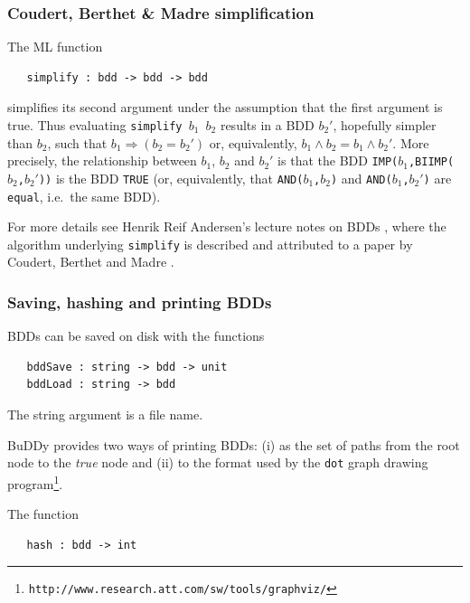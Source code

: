 \documentclass[12pt,fleqn]{book}
\renewcommand{\t}[1]{\mbox{\tt #1}}
\newcommand{\Buddy}{BuDDy{}}
\begin{document}
\subsubsection{Coudert, Berthet \& Madre simplification}

The ML function

\begin{verbatim}
   simplify : bdd -> bdd -> bdd
\end{verbatim}

simplifies its second argument under the assumption that the first
argument is true. Thus evaluating
\t{simplify~$b_1$~$b_2$} results in a BDD $b_2'$, hopefully simpler than $b_2$, such that
$b_1 \Rightarrow (b_2 = b_2')$ or, equivalently, \mbox{$b_1 \wedge b_2 = b_1 \wedge b_2'$}.
More precisely,
the relationship between $b_1$, $b_2$ and $b_2'$ is that
the BDD \t{IMP($b_1$,BIIMP($b_2$,$b_2'$))} is the BDD \t{TRUE}
(or, equivalently, that \t{AND($b_1$,$b_2$)} and \t{AND($b_1$,$b_2'$)}
are \t{equal}, i.e.~the same BDD).

For more details see Henrik Reif Andersen's lecture
notes on BDDs \cite{HenrikNotes}, where
the algorithm underlying \t{simplify} is described and attributed to a paper by
Coudert, Berthet and Madre \cite{CoudertBerthetMadre}.

\subsubsection{Saving, hashing and printing BDDs}\label{printing}

BDDs can be saved on disk with the functions

\begin{verbatim}
   bddSave : string -> bdd -> unit
   bddLoad : string -> bdd
\end{verbatim}

The string argument is a file name.

\Buddy{} provides two ways of printing BDDs: (i) as the set of paths from
the root node to the {\it{true}} node and (ii) to the format used by
the \t{dot} graph drawing
program\footnote{\texttt{http://www.research.att.com/sw/tools/graphviz/}}.

The function

\begin{verbatim}
   hash : bdd -> int
\end{verbatim}
\end{document}
